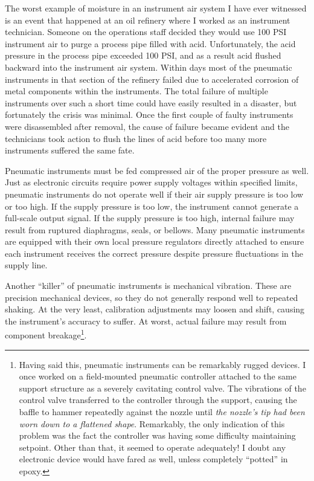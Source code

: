 The worst example of moisture in an instrument air system I have ever witnessed is an event that happened at an oil refinery where I worked as an instrument technician.  Someone on the operations staff decided they would use 100 PSI instrument air to purge a process pipe filled with acid.  Unfortunately, the acid pressure in the process pipe exceeded 100 PSI, and as a result acid flushed backward into the instrument air system.  Within days most of the pneumatic instruments in that section of the refinery failed due to accelerated corrosion of metal components within the instruments.  The total failure of multiple instruments over such a short time could have easily resulted in a disaster, but fortunately the crisis was minimal.  Once the first couple of faulty instruments were disassembled after removal, the cause of failure became evident and the technicians took action to flush the lines of acid before too many more instruments suffered the same fate.

Pneumatic instruments must be fed compressed air of the proper pressure as well.  Just as electronic circuits require power supply voltages within specified limits, pneumatic instruments do not operate well if their air supply pressure is too low or too high.  If the supply pressure is too low, the instrument cannot generate a full-scale output signal.  If the supply pressure is too high, internal failure may result from ruptured diaphragms, seals, or bellows.  Many pneumatic instruments are equipped with their own local pressure regulators directly attached to ensure each instrument receives the correct pressure despite pressure fluctuations in the supply line.

Another ``killer'' of pneumatic instruments is mechanical vibration.  These are precision mechanical devices, so they do not generally respond well to repeated shaking.  At the very least, calibration adjustments may loosen and shift, causing the instrument's accuracy to suffer.  At worst, actual failure may result from component breakage\footnote{Having said this, pneumatic instruments can be remarkably rugged devices.  I once worked on a field-mounted pneumatic controller attached to the same support structure as a severely cavitating control valve.  The vibrations of the control valve transferred to the controller through the support, causing the baffle to hammer repeatedly against the nozzle until \textit{the nozzle's tip had been worn down to a flattened shape}.  Remarkably, the only indication of this problem was the fact the controller was having some difficulty maintaining setpoint.  Other than that, it seemed to operate adequately!  I doubt any electronic device would have fared as well, unless completely ``potted'' in epoxy.}.






